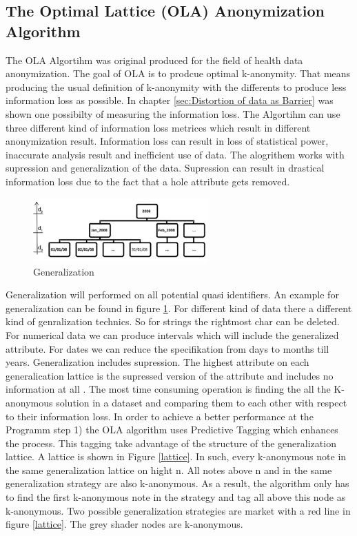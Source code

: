 \documentclass{llncs}
\begin{document}
\subsection{The Optimal Lattice (OLA)  Anonymization Algorithm}

The OLA Algortihm was original produced for the field of health data anonymization. The goal of OLA is  to prodcue optimal k-anonymity. That means producing the usual definition of k-anonymity with the differents to produce less information loss as possible. In chapter \ref{sec:Distortion of data as Barrier} was shown one possibilty of measuring the information loss. 
The Algortihm can use three different kind of information loss metrices which result in different anonymization result. Information loss can result in loss of statistical power, inaccurate analysis result and inefficient use of data.  The alogrithem works with supression and generalization of the data. Supression can result in drastical information loss due to the fact that a hole attribute gets removed.\\

\begin{figure}
	\centering
	\includegraphics[width=0.6\textwidth]{general1.png}
	\caption{Generalization}%
	\label{Generalization}
\end{figure}



Generalization will performed on all potential quasi identifiers. An example for generalization can be found in figure \ref{Generalization}. For different kind of data there a different kind of genralization technics. So for strings the rightmost char can be deleted. For numerical data we can produce intervals which will include the generalized attribute. For dates we can reduce the specifikation from days to months till years. Generalization includes supression. The highest attribute on each generalication lattice is the supressed version of the attribute and includes no information at all \cite{el2009globally}. The most time consuming operation is finding the all the K-anonymous solution in a dataset and comparing them to each other with respect to their information loss. In order to achieve a better performance at the Programm step 1) the OLA algorithm uses Predictive Tagging which enhances the process.  This tagging take advantage of the structure of the generalization lattice. A lattice is shown in Figure \ref{lattice}. In such, every k-anonymous note in the same generalization lattice on hight n. All notes above n and in the same generalization strategy are also k-anonymous. As a result, the algorithm only has to find the first k-anonymous note in the strategy and tag all above this node as k-anonymous. Two possible generalization strategies are market with a red line in figure \ref{lattice}. The grey shader nodes are k-anonymous.
\end{document}
